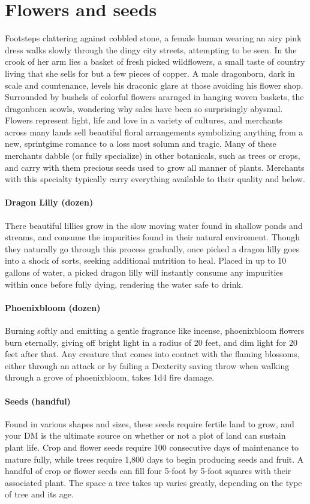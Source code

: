 \documentclass[10pt,a4paper,twoside,twocolumn,openany,nodeprecatedcode,bg=print]{dndbook}
\begin{document}
\section{Flowers and seeds}
Footsteps clattering against cobbled stone, a female human wearing an airy pink dress walks slowly through the dingy city streets, attempting to be seen. In the crook of her arm lies a basket of fresh picked wildflowers, a small taste of country living that she sells for but a few pieces of copper.
A male dragonborn, dark in scale and countenance, levels his draconic glare at those avoiding his flower shop. Surrounded by bushels of colorful flowers ararnged in hanging woven baskets, the dragonborn scowls, wondering why sales have been so surprisingly abysmal.
Flowers represent light, life and love in a variety of cultures, and merchants across many lands sell beautiful floral arrangements symbolizing anything from a new, sprintgime romance to a loss most solumn and tragic. Many of these merchants dabble (or fully specialize) in other botanicals, such as trees or crops, and carry with them precious seeds used to grow all manner of plants. Merchants with this specialty typically carry everything available to their quality and below.
\paragraph{Dragon Lilly (dozen)}
There beautiful lillies grow in the slow moving water found in shallow ponds and streams, and consume the impurities found in their natural enviroment. Though they naturally go through this process gradually, once picked a dragon lilly goes into a shock of sorts, seeking additional nutrition to heal. Placed in up to 10 gallons of water, a picked dragon lilly will instantly consume any impurities within once before fully dying, rendering the water safe to drink.
\paragraph{Phoenixbloom (dozen)}
Burning softly and emitting a gentle fragrance like incense, phoenixbloom flowers burn eternally, giving off bright light in a radius of 20 feet, and dim light for 20 feet after that. Any creature that comes into contact with the flaming blossoms, either through an attack or by failing a Dexterity saving throw when walking through a grove of phoenixbloom, takes 1d4 fire damage.
\paragraph{Seeds (handful)}
Found in various shapes and sizes, these seeds require fertile land to grow, and your DM is the ultimate source on whether or not a plot of land can sustain plant life. Crop and flower seeds require 100 consecutive days of maintenance to mature fully, while trees require 1,800 days to begin producing seeds and fruit. A handful of crop or flower seeds can fill four 5-foot by 5-foot squares with their associated plant. The space a tree takes up varies greatly, depending on the type of tree and its age.
\end{document}
